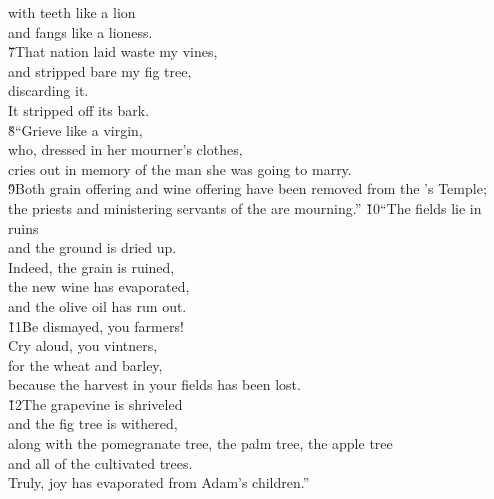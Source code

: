 \begin{poetry}
\poeml with teeth like a lion \\
\poemll    and fangs like a lioness. \\
\poeml \v{7}That nation laid waste my vines, \\
\poemll    and stripped bare my fig tree, \\
\poemlll       discarding it. \\
\poeml It stripped off its bark. \\
\poeml \v{8}``Grieve like a virgin, \\
\poemll    who, dressed in her mourner's clothes, \\
\poemlll       cries out in memory of the man she was going to marry. \\
\poeml \v{9}Both grain offering and wine offering have been removed from the 's Temple; \\
\poemll    the priests and ministering servants of the  are mourning.''
\poeml \v{10}``The fields lie in ruins \\
\poemll    and the ground is dried up. \\
\poeml Indeed, the grain is ruined, \\
\poemll    the new wine has evaporated, \\
\poemlll       and the olive oil has run out. \\
\poeml \v{11}Be dismayed, you farmers! \\
\poemll    Cry aloud, you vintners, \\
\poemlll       for the wheat and barley, \\
\poemll    because the harvest in your fields has been lost. \\
\poeml \v{12}The grapevine is shriveled \\
\poemll    and the fig tree is withered, \\
\poeml along with the pomegranate tree, the palm tree, the apple tree \\
\poemll    and all of the cultivated trees. \\
\poeml Truly, joy has evaporated from Adam's children.''

\end{poetry}
